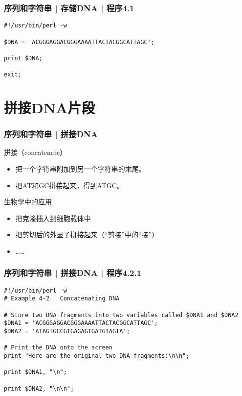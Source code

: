 \begin{frame}[fragile]
  \frametitle{序列和字符串 | 存储DNA | 程序4.1}
\begin{lstlisting}
#!/usr/bin/perl -w

$DNA = 'ACGGGAGGACGGGAAAATTACTACGGCATTAGC';

print $DNA;

exit;
\end{lstlisting}
\end{frame}


\section{拼接DNA片段}
\begin{frame}
  \frametitle{序列和字符串 | 拼接DNA}
  \begin{block}{拼接（concatenate）}
    \begin{itemize}
      \item 把一个字符串附加到另一个字符串的末尾。
      \item 把AT和GC拼接起来，得到ATGC。
    \end{itemize}
  \end{block}
  \pause
  \begin{block}{生物学中的应用}
    \begin{itemize}
      \item 把克隆插入到细胞载体中
      \item 把剪切后的外显子拼接起来（“剪接”中的“接”）
      \item ……
    \end{itemize}
  \end{block}
\end{frame}

\begin{frame}[fragile,label=exam4.2.1]
  \frametitle{序列和字符串 | 拼接DNA | 程序4.2.1}
\begin{lstlisting}
#!/usr/bin/perl -w
# Example 4-2   Concatenating DNA

# Store two DNA fragments into two variables called $DNA1 and $DNA2
$DNA1 = 'ACGGGAGGACGGGAAAATTACTACGGCATTAGC';
$DNA2 = 'ATAGTGCCGTGAGAGTGATGTAGTA';

# Print the DNA onto the screen
print "Here are the original two DNA fragments:\n\n";

print $DNA1, "\n";

print $DNA2, "\n\n";
\end{lstlisting}
\end{frame}

